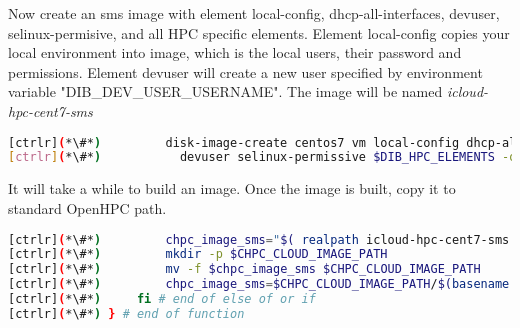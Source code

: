 	Now create an sms image with element local-config, dhcp-all-interfaces, devuser, selinux-permisive, and all HPC specific elements. Element local-config copies your local environment into image, which is the local users, their password and permissions. Element devuser will create a new user specified by environment variable "DIB\_DEV\_USER\_USERNAME". The image will be named  {\em  icloud-hpc-cent7-sms }


\begin{lstlisting}[language=bash,keywords={}]
[ctrlr](*\#*)         disk-image-create centos7 vm local-config dhcp-all-interfaces \
[ctrlr](*\#*)         	devuser selinux-permissive $DIB_HPC_ELEMENTS -o icloud-hpc-cent7-sms
\end{lstlisting} 

	It will take a while to build an image. Once the image is built, copy it to standard OpenHPC path.


\begin{lstlisting}[language=bash,keywords={}]
[ctrlr](*\#*)         chpc_image_sms="$( realpath icloud-hpc-cent7-sms.qcow2)"
[ctrlr](*\#*)         mkdir -p $CHPC_CLOUD_IMAGE_PATH
[ctrlr](*\#*)         mv -f $chpc_image_sms $CHPC_CLOUD_IMAGE_PATH
[ctrlr](*\#*)         chpc_image_sms=$CHPC_CLOUD_IMAGE_PATH/$(basename $chpc_image_sms)
[ctrlr](*\#*)     fi # end of else of or if
[ctrlr](*\#*) } # end of function
\end{lstlisting} 
